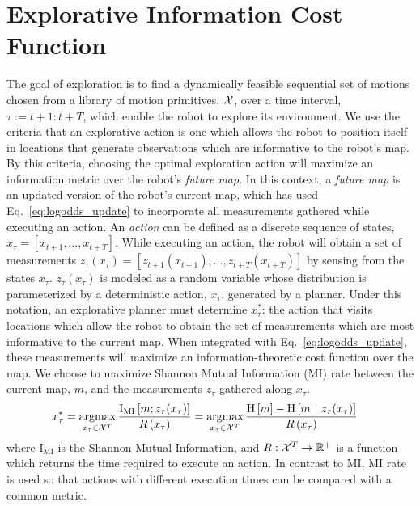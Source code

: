 \section{Explorative Information Cost Function}
\label{section:explorative_information_cost_function}

The goal of exploration is to find a dynamically feasible sequential set of motions chosen from a library of motion primitives, $\mathcal{X}$, over a time interval, $\tau := t+1 : t+T$, which enable the robot to explore its environment. We use the criteria that an explorative action is one which allows the robot to position itself in locations that generate observations which are informative to the robot's map. By this criteria, choosing the optimal exploration action will maximize an information metric over the robot's \textit{future map}. In this context, a \textit{future map} is an updated version of the robot's current map, which has used Eq.~\eqref{eq:logodds_update} to incorporate all measurements gathered while executing an action. An \textit{action} can be defined as a discrete sequence of states, $x_{\tau} = \left[x_{t+1},\dots,x_{t+T}\right]$. While executing an action, the robot will obtain a set of measurements $z_{\tau}(x_{\tau}) = \left[z_{t+1}(x_{t+1}),\dots,z_{t+T}(x_{t+T})\right]$ by sensing from the states $x_{\tau}$. $z_{\tau}(x_{\tau})$ is modeled as a random variable whose distribution is parameterized by a deterministic action, $x_{\tau}$, generated by a planner. Under this notation, an explorative planner must determine $x_{\tau}^{*}$: the action that visits locations which allow the robot to obtain the set of measurements which are most informative to the current map. When integrated with Eq.~\eqref{eq:logodds_update}, these measurements will maximize an information-theoretic cost function over the map. We choose to maximize Shannon Mutual Information (MI) rate between the current map, $m$, and the measurements $z_{\tau}$ gathered along $x_{\tau}$.
%
\begin{align}
  \begin{split}
    x_{\tau}^{*}
    &=
    \argmax_{x_{\tau} \in \mc{X}^{T}}
    \frac{\text{I}_{\text{MI}}
      \left[
        m
        ;
        z_{\tau}(x_{\tau})
      \right]
    }
    {R\left(x_{\tau}\right)}
    =
    \argmax_{x_{\tau} \in \mc{X}^{T}}
    \frac{
      \text{H}
      \left[
        m
      \right]
      -
      \text{H}
      \left[
        m
        \ \vert \
        z_{\tau}(x_{\tau})
      \right]
    }
    {R\left(x_{\tau}\right)}
  \end{split}
\end{align}
%
where $\text{I}_{\text{MI}}$ is the Shannon Mutual Information, and $R: \mathcal{X}^{T} \rightarrow {\mathbb{R}}^{+}$ is a function which returns the time required to execute an action. In contrast to MI, MI rate is used so that actions with different execution times can be compared with a common metric.

